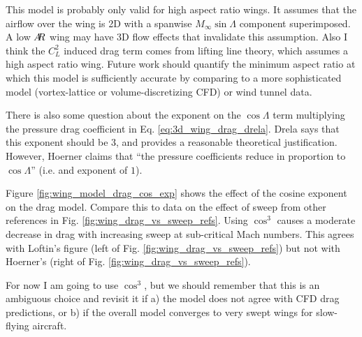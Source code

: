 \documentclass[12pt]{article}
\newcommand{\ar}{A\mkern-6mu R}
\begin{document}
This model is probably only valid for high aspect ratio wings. It assumes that the airflow over the wing is 2D with a spanwise $M_\infty \sin\Lambda$ component superimposed. A low $\ar$ wing may have 3D flow effects that invalidate this assumption.
Also I think the $C_L^2$ induced drag term comes from lifting line theory, which assumes a high aspect ratio wing.
Future work should quantify the minimum aspect ratio at which this model is sufficiently accurate by comparing to  a more sophisticated model (vortex-lattice or volume-discretizing CFD) or wind tunnel data.

There is also some question about the exponent on the $\cos \Lambda$ term multiplying the pressure drag coefficient in Eq. \ref{eq:3d_wing_drag_drela}. Drela \cite{Drela2014} says that this exponent should be $3$, and provides a reasonable theoretical justification. However, Hoerner \cite{Hoerner1965} claims that ``the pressure coefficients reduce in proportion to $\cos \Lambda$'' (i.e. and exponent of $1$).

Figure \ref{fig:wing_model_drag_cos_exp} shows the effect of the cosine exponent on the drag model. Compare this to data on the effect of sweep from other references in Fig. \ref{fig:wing_drag_vs_sweep_refs}. Using $\cos^3$ causes a moderate decrease in drag with increasing sweep at sub-critical Mach numbers. This agrees with Loftin's figure (left of Fig. \ref{fig:wing_drag_vs_sweep_refs}) but not with Hoerner's (right of Fig. \ref{fig:wing_drag_vs_sweep_refs}).

For now I am going to use $\cos^3$, but we should remember that this is an ambiguous choice and revisit it if a) the model does not agree with CFD drag predictions, or b) if the overall model converges to very swept wings for slow-flying aircraft.
\end{document}
